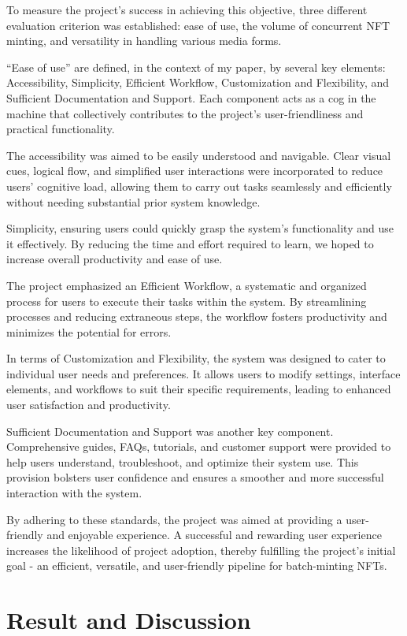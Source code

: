 \documentclass[10pt,twocolumn]{article}
\begin{document}
To measure the project's success in achieving this objective,  three different evaluation criterion was established: ease of use, the volume of concurrent NFT minting, and versatility in handling various media forms.

“Ease of use” are defined, in the context of my paper, by several key elements: Accessibility, Simplicity, Efficient Workflow, Customization and Flexibility, and Sufficient Documentation and Support. Each component acts as a cog in the machine that collectively contributes to the project's user-friendliness and practical functionality.

The accessibility was aimed to be easily understood and navigable. Clear visual cues, logical flow, and simplified user interactions were incorporated to reduce users' cognitive load, allowing them to carry out tasks seamlessly and efficiently without needing substantial prior system knowledge.

Simplicity, ensuring users could quickly grasp the system's functionality and use it effectively. By reducing the time and effort required to learn, we hoped to increase overall productivity and ease of use.

The project emphasized an Efficient Workflow, a systematic and organized process for users to execute their tasks within the system. By streamlining processes and reducing extraneous steps, the workflow fosters productivity and minimizes the potential for errors.

In terms of Customization and Flexibility, the system was designed to cater to individual user needs and preferences. It allows users to modify settings, interface elements, and workflows to suit their specific requirements, leading to enhanced user satisfaction and productivity.

Sufficient Documentation and Support was another key component. Comprehensive guides, FAQs, tutorials, and customer support were provided to help users understand, troubleshoot, and optimize their system use. This provision bolsters user confidence and ensures a smoother and more successful interaction with the system.

By adhering to these standards, the project was aimed at providing a user-friendly and enjoyable experience. A successful and rewarding user experience increases the likelihood of project adoption, thereby fulfilling the project's initial goal - an efficient, versatile, and user-friendly pipeline for batch-minting NFTs.
\section{Result and Discussion}
\end{document}
